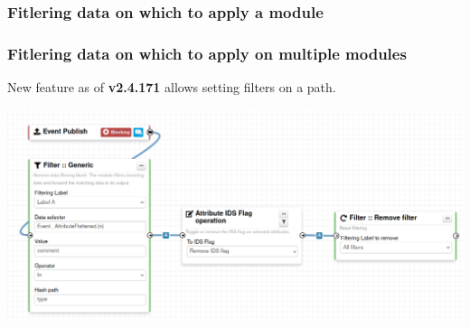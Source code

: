 \begin{frame}
    \frametitle{Fitlering data on which to apply a module}
\end{frame}

\begin{frame}
    \frametitle{Fitlering data on which to apply on multiple modules}
    New feature as of \textbf{v2.4.171} allows setting filters on a path.
    \begin{center}
        \includegraphics[width=1.0\textwidth]{pictures/remove-ids-generic.png}
    \end{center}
\end{frame}

